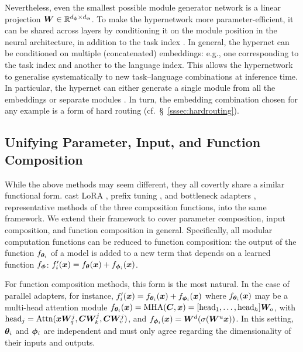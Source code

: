 \documentclass[10pt]{article} %
\begin{document}
Nevertheless, even the smallest possible module generator network is a linear projection ${\bm{W}} \in \mathbb{R}^{d_{\bm{\phi}} \times d_{\bm{\alpha}}}$.
To make the hypernetwork more parameter-efficient, it can be shared across layers by conditioning it on the module position in the neural architecture, in addition to the task index \citep{mahabadi2021parameter}. In general, the hypernet can be conditioned on multiple (concatenated) embeddings: e.g., one corresponding to the task index and another to the language index. This allows the hypernetwork to generalise systematically to new task--language combinations at inference time. In particular, the hypernet can either generate a single module from all the embeddings \citep{ponti-etal-2021-parameter} or separate modules \citep{Ansell2021MADG,Ustun:2022hyperx}. In turn, the embedding combination chosen for any example is a form of hard routing (cf.\ \S~\ref{sssec:hardrouting}).

 

\subsection{Unifying Parameter, Input, and Function Composition} \label{sec:unifying_composition}

While the above methods may seem different, they all covertly share a similar functional form. \citet{He2021UnifiedAdapters} cast LoRA \citep{hu2021lora}, prefix tuning \citep{Li2020PrefixTuning}, and bottleneck adapters \citep{houlsby2019parameter}, representative methods of the three composition functions, into the same framework. We extend their framework to cover parameter composition, input composition, and function composition in general. Specifically, all modular computation functions can be reduced to function composition: the output of the function $f_{{\bm{\theta}}_i}$ of a model is added to a new term that depends on a learned function $f_{{\bm{\phi}}}$: $f_i^\prime({\bm{x}}) = f_{{\bm{\theta}}}({\bm{x}}) + f_{{\bm{\phi}}_i}({\bm{x}})$. 

For function composition methods, this form is the most natural. In the case of parallel adapters, for instance, $f_i^\prime({\bm{x}}) =  f_{{\bm{\theta}}_i}({\bm{x}}) + f_{{\bm{\phi}}_i}({\bm{x}})$ where $f_{{\bm{\theta}}_i}({\bm{x}})$ may be a multi-head attention module $f_{{\bm{\theta}}_i}({\bm{x}}) = \text{MHA}({\bm{C}}, {\bm{x}}) = [\text{head}_1, \ldots, \text{head}_h] {\bm{W}}_o$, with $\text{head}_j = \text{Attn} ({\bm{x}} {\bm{W}}_q^j, {\bm{C}} {\bm{W}}_k^j, {\bm{C}} {\bm{W}}_v^j)$, and $f_{{\bm{\phi}}_i}({\bm{x}}) = {\bm{W}}^d(\sigma({\bm{W}}^u {\bm{x}}))$. In this setting, ${\bm{\theta}}_i$ and ${\bm{\phi}}_i$ are independent and must only agree regarding the dimensionality of their inputs and outputs.
\end{document}
